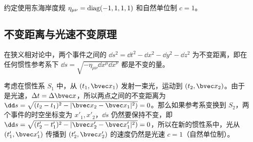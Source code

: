 

约定使用东海岸度规 $\eta_{\mu\nu}=\rm{diag}(-1,1,1,1)$ 和自然单位制 $c=1$。
\subsection{不变距离与光速不变原理}
在狭义相对论中，两个事件之间的 $\dd s^2=\dd t^2-\dd x^2-\dd y^2-\dd z^2$ 为不变距离，即在任何惯性参考系下 $\dd s=\sqrt{-\eta_{\mu\nu}\dd x^\mu \dd x^\nu}$ 都是不变的量。

考虑在惯性系 $S_1$ 中，从 $(t_1,\bvec x_1)$ 发射一束光，运动到 $(t_2,\bvec x_2)$。由于是光速，$\Delta t=\Delta \bvec x$，所以两点之间的不变距离为 $\dd s=\sqrt{(t_2-t_1)^2-|\bvec x_2-\bvec x_1|^2)}=0$。那么如果参考系变换到 $S_2$，两个事件的时空坐标变为 $x'_1,x'_2$，$\dd s$ 仍然要保持不变，即 $\dd s=\sqrt{(t'_2-t'_1)^2-|\bvec x'_2-\bvec x'_1|^2)}=0$，所以在新的惯性系中，光从 $(t'_1,\bvec x'_1)$ 传播到 $(t'_2,\bvec x'_2)$ 的速度仍然是光速 $c=1$（自然单位制）。